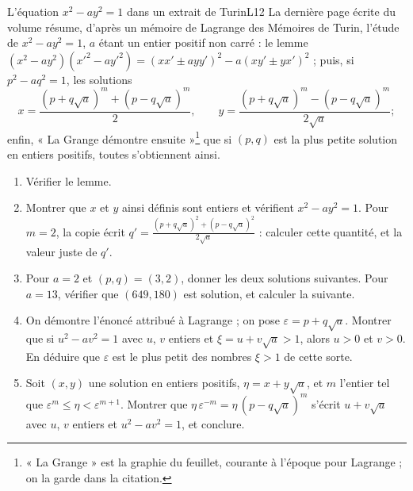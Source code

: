\documentclass[11pt,a4paper]{article}
\begin{document}
\begin{exercice}{L'équation $x^2 - ay^2 = 1$ dans un extrait de Turin}{L1}{2}
La dernière page écrite du volume résume, d'après un mémoire de Lagrange des Mémoires
de Turin, l'étude de $x^2 - ay^2 = 1$, $a$ étant un entier positif non carré : le
lemme $(x^2 - ay^2)(x'^2 - ay'^2) = (xx' \pm ayy')^2 - a(xy' \pm yx')^2$ ; puis, si
$p^2 - aq^2 = 1$, les solutions
\[
x = \frac{(p + q\sqrt a)^m + (p - q\sqrt a)^m}{2}, \qquad
y = \frac{(p + q\sqrt a)^m - (p - q\sqrt a)^m}{2\sqrt a} ;
\]
enfin, « La Grange démontre ensuite »\footnote{« La Grange » est la graphie du
feuillet, courante à l'époque pour Lagrange ; on la garde dans la citation.} que si $(p,q)$ est la plus petite solution en
entiers positifs, toutes s'obtiennent ainsi.
\begin{enumerate}
\item Vérifier le lemme.
\item Montrer que $x$ et $y$ ainsi définis sont entiers et vérifient $x^2 - ay^2 = 1$.
  Pour $m = 2$, la copie écrit
  $q' = \frac{(p+q\sqrt a)^2 + (p - q\sqrt a)^2}{2\sqrt a}$ : calculer cette quantité,
  et la valeur juste de $q'$.
\item Pour $a = 2$ et $(p,q) = (3,2)$, donner les deux solutions suivantes. Pour
  $a = 13$, vérifier que $(649, 180)$ est solution, et calculer la suivante.
\item On démontre l'énoncé attribué à Lagrange ; on pose $\varepsilon = p + q\sqrt a$.
  Montrer que si $u^2 - av^2 = 1$ avec $u$, $v$ entiers et $\xi = u + v\sqrt a > 1$,
  alors $u > 0$ et $v > 0$. En déduire que $\varepsilon$ est le plus petit des nombres
  $\xi > 1$ de cette sorte.
\item Soit $(x,y)$ une solution en entiers positifs, $\eta = x + y\sqrt a$, et $m$
  l'entier tel que $\varepsilon^m \le \eta < \varepsilon^{m+1}$. Montrer que
  $\eta\,\varepsilon^{-m} = \eta\,(p - q\sqrt a)^m$ s'écrit $u + v\sqrt a$ avec $u$, $v$
  entiers et $u^2 - av^2 = 1$, et conclure.
\end{enumerate}
\end{exercice}
\end{document}

